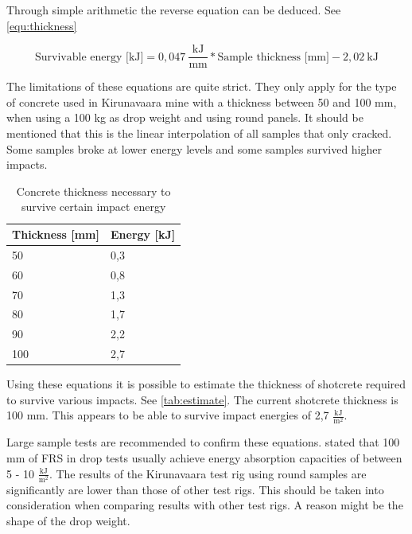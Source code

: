  Through simple arithmetic the reverse equation can be deduced. See \autoref{equ:thickness}

\begin{equation} \label{equ:thickness}
    \text{Survivable energy [kJ]} = 0,047 ~\frac{\text{kJ}}{\text{mm}} * \text{Sample thickness [mm]} - 2,02 ~\text{kJ}
\end{equation}

The limitations of these equations are quite strict. They only apply for the type of concrete used in Kirunavaara mine with a thickness between 50 and 100 mm, when using a 100 kg as drop weight and using round panels. It should be mentioned that this is the linear interpolation of all samples that only cracked. Some samples broke at lower energy levels and some samples survived higher impacts.

\begin{table}
    \centering
    \begin{tabular}{ll}
    \toprule
    Thickness [mm]  & Energy [kJ]\\
    \midrule
    50             &   0,3 \\
    60              &   0,8 \\
    70             &   1,3 \\
    80              &   1,7 \\
    90             &   2,2 \\
    100              &   2,7 \\
    \bottomrule
    \end{tabular}
    \caption{Concrete thickness necessary to survive certain impact energy}
    \label{tab:estimate}
\end{table}

Using these equations it is possible to estimate the thickness of shotcrete required to survive various impacts. See \autoref{tab:estimate}. The current shotcrete thickness is 100 mm. This appears to be able to survive impact energies of 2,7 \(\frac{\text{kJ}}{\text{m}^\text{2}}\). %

Large sample tests are recommended to confirm these equations. \textcite{Potvin10} stated that 100 mm of FRS in drop tests usually achieve energy absorption capacities of between 5 - 10 \(\frac{\text{kJ}}{\text{m}^\text{2}}\). 
The results of the Kirunavaara test rig using round samples are significantly are lower than those of other test rigs. This should be taken into consideration when comparing results with other test rigs. A reason might be the shape of the drop weight.